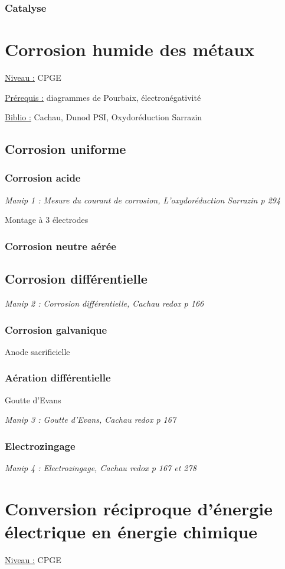 \documentclass{article}%
\begin{document}
\subsubsection{Catalyse}
\section{Corrosion humide des métaux}
\underline{Niveau :} CPGE 

\underline{Prérequis :} diagrammes de Pourbaix, électronégativité

\underline{Biblio :} Cachau, Dunod PSI, Oxydoréduction Sarrazin

\subsection{Corrosion uniforme}
\subsubsection{Corrosion acide}
\textit{Manip 1 : Mesure du courant de corrosion, L'oxydoréduction Sarrazin p 294}

Montage à 3 électrodes
\subsubsection{Corrosion neutre aérée}
\subsection{Corrosion différentielle}
\textit{Manip 2 : Corrosion différentielle, Cachau redox p 166}
\subsubsection{Corrosion galvanique}
Anode sacrificielle
\subsubsection{Aération différentielle}
Goutte d'Evans

\textit{Manip 3 : Goutte d'Evans, Cachau redox p 167}
\subsubsection{Electrozingage}

\textit{Manip 4 : Electrozingage, Cachau redox p 167 et 278}

\section{Conversion réciproque d'énergie électrique en énergie chimique}
\underline{Niveau :} CPGE 
\end{document}
